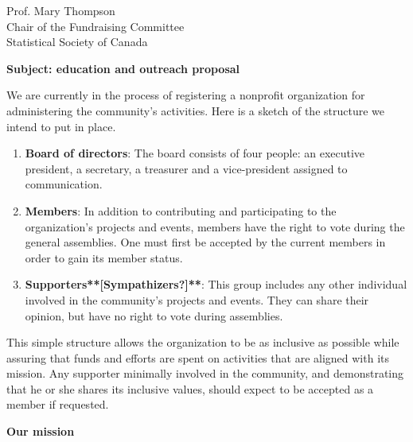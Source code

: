 \documentclass[11pt, a4paper]{letter} %
\begin{document}
\begin{letter}{
	Prof. Mary Thompson\\
	Chair of the Fundraising Committee\\
	Statistical Society of Canada
	
	\bigskip
	\textbf{Subject: education and outreach proposal}%
}
We are currently in the process of registering a nonprofit organization for administering the community's activities. Here is a sketch of the structure we intend to put in place.

\begin{enumerate}
	\item[] \textbf{Board of directors}: The board consists of four people: an executive president, a secretary, a treasurer and a vice-president assigned to communication.
	\item[] \textbf{Members}: In addition to contributing and participating to the organization's projects and events, members have the right to vote during the general assemblies. One must first be accepted by the current members in order to gain its member status.
	\item[] \textbf{Supporters**[Sympathizers?]**}: This group includes any other individual involved in the community's projects and events. They can share their opinion, but have no right to vote during assemblies.
\end{enumerate}

This simple structure allows the organization to be as inclusive as possible while assuring that funds and efforts are spent on activities that are aligned with its mission. Any supporter minimally involved in the community, and demonstrating that he or she shares its inclusive values, should expect to be accepted as a member if requested.

\bigskip
\noindent \textbf{Our mission}


\end{letter}
\end{document}

